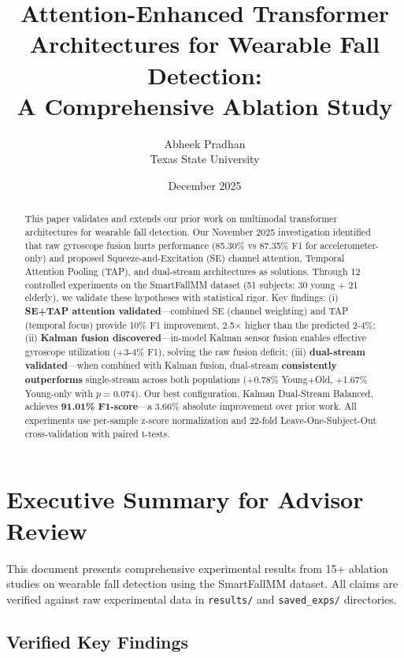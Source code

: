 \documentclass{article}
\title{Attention-Enhanced Transformer Architectures for Wearable Fall Detection:\\A Comprehensive Ablation Study}
\author{Abheek Pradhan\\Texas State University}
\date{December 2025}
\begin{document}
\maketitle

\begin{abstract}
This paper validates and extends our prior work on multimodal transformer architectures for wearable fall detection. Our November 2025 investigation identified that raw gyroscope fusion hurts performance (85.30\% vs 87.35\% F1 for accelerometer-only) and proposed Squeeze-and-Excitation (SE) channel attention, Temporal Attention Pooling (TAP), and dual-stream architectures as solutions. Through 12 controlled experiments on the SmartFallMM dataset (51 subjects: 30 young + 21 elderly), we validate these hypotheses with statistical rigor. Key findings: (i) \textbf{SE+TAP attention validated}---combined SE (channel weighting) and TAP (temporal focus) provide 10\% F1 improvement, 2.5$\times$ higher than the predicted 2-4\%; (ii) \textbf{Kalman fusion discovered}---in-model Kalman sensor fusion enables effective gyroscope utilization (+3-4\% F1), solving the raw fusion deficit; (iii) \textbf{dual-stream validated}---when combined with Kalman fusion, dual-stream \textbf{consistently outperforms} single-stream across both populations (+0.78\% Young+Old, +1.67\% Young-only with $p=0.074$). Our best configuration, Kalman Dual-Stream Balanced, achieves \textbf{91.01\% F1-score}---a 3.66\% absolute improvement over prior work. All experiments use per-sample z-score normalization and 22-fold Leave-One-Subject-Out cross-validation with paired t-tests.
\end{abstract}

\section*{Executive Summary for Advisor Review}

This document presents comprehensive experimental results from 15+ ablation studies on wearable fall detection using the SmartFallMM dataset. All claims are verified against raw experimental data in \texttt{results/} and \texttt{saved\_exps/} directories.

\subsection*{Verified Key Findings}
\end{document}
